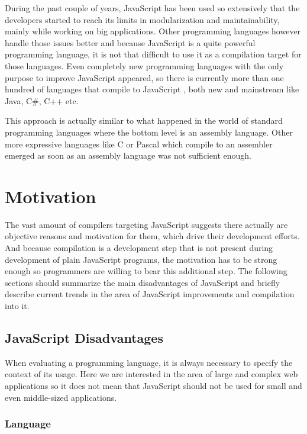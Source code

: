 \documentclass[12pt,a4paper]{report}
\begin{document}
During the past couple of years, JavaScript has been used so extensively that the developers started to reach its limits in modularization and maintainability, mainly while working on big applications. Other programming languages however handle those issues better and because JavaScript is a quite powerful programming language, it is not that difficult to use it as a compilation target for those languages. Even completely new programming languages with the only purpose to improve JavaScript appeared, so there is currently more than one hundred of languages that compile to JavaScript \cite{Backends}, both new and mainstream like Java, C\#, C++ etc.

This approach is actually similar to what happened in the world of standard programming languages where the bottom level is an assembly language. Other more expressive languages like C or Pascal which compile to an assembler emerged as soon as an assembly language was not sufficient enough.

\section{Motivation}
\label{sec:Motivation}

The vast amount of compilers targeting JavaScript suggests there actually are objective reasons and motivation for them, which drive their development efforts. And because compilation is a development step that is not present during development of plain JavaScript programs, the motivation has to be strong enough so programmers are willing to bear this additional step. The following sections should summarize the main disadvantages of JavaScript and briefly describe current trends in the area of JavaScript improvements and compilation into it.

\subsection{JavaScript Disadvantages}

When evaluating a programming language, it is always necessary to specify the context of its usage. Here we are interested in the area of large and complex web applications so it does not mean that JavaScript should not be used for small and even middle-sized applications.

\subsubsection*{Language} 
\end{document}

